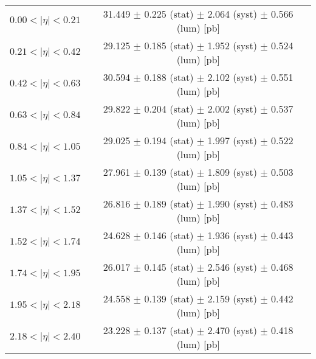 \begin{tabular}{lc}
\hline
$0.00 < |\eta| <0.21$          & 31.449 $\pm$ 0.225 (stat) $\pm$ 2.064 (syst) $\pm$ 0.566 (lum) [pb]  \\
$0.21 < |\eta| <0.42$          & 29.125 $\pm$ 0.185 (stat) $\pm$ 1.952 (syst) $\pm$ 0.524 (lum) [pb]  \\
$0.42 < |\eta| <0.63$          & 30.594 $\pm$ 0.188 (stat) $\pm$ 2.102 (syst) $\pm$ 0.551 (lum) [pb]  \\
$0.63 < |\eta| <0.84$          & 29.822 $\pm$ 0.204 (stat) $\pm$ 2.002 (syst) $\pm$ 0.537 (lum) [pb]  \\
$0.84 < |\eta| <1.05$          & 29.025 $\pm$ 0.194 (stat) $\pm$ 1.997 (syst) $\pm$ 0.522 (lum) [pb]  \\
$1.05 < |\eta| <1.37$          & 27.961 $\pm$ 0.139 (stat) $\pm$ 1.809 (syst) $\pm$ 0.503 (lum) [pb]  \\
$1.37 < |\eta| <1.52$          & 26.816 $\pm$ 0.189 (stat) $\pm$ 1.990 (syst) $\pm$ 0.483 (lum) [pb]  \\
$1.52 < |\eta| <1.74$          & 24.628 $\pm$ 0.146 (stat) $\pm$ 1.936 (syst) $\pm$ 0.443 (lum) [pb]  \\
$1.74 < |\eta| <1.95$          & 26.017 $\pm$ 0.145 (stat) $\pm$ 2.546 (syst) $\pm$ 0.468 (lum) [pb]  \\
$1.95 < |\eta| <2.18$          & 24.558 $\pm$ 0.139 (stat) $\pm$ 2.159 (syst) $\pm$ 0.442 (lum) [pb]  \\
$2.18 < |\eta| <2.40$          & 23.228 $\pm$ 0.137 (stat) $\pm$ 2.470 (syst) $\pm$ 0.418 (lum) [pb]  \\
\hline
\end{tabular}
